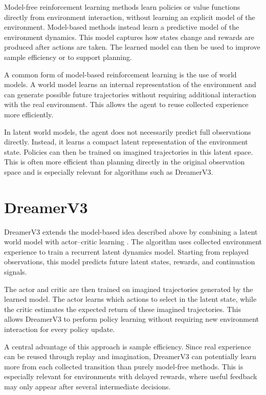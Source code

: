 \documentclass[english,bachelor]{hsluthesis}
\begin{document}
Model-free reinforcement learning methods learn policies or value functions directly from environment interaction, without learning an explicit model of the environment. Model-based methods instead learn a predictive model of the environment dynamics. This model captures how states change and rewards are produced after actions are taken. The learned model can then be used to improve sample efficiency or to support planning.

A common form of model-based reinforcement learning is the use of world models. A world model learns an internal representation of the environment and can generate possible future trajectories without requiring additional interaction with the real environment. This allows the agent to reuse collected experience more efficiently.

In latent world models, the agent does not necessarily predict full observations directly. Instead, it learns a compact latent representation of the environment state. Policies can then be trained on imagined trajectories in this latent space. This is often more efficient than planning directly in the original observation space and is especially relevant for algorithms such as DreamerV3.

\section{DreamerV3}

DreamerV3 extends the model-based idea described above by combining a latent world model with actor--critic learning \cite{hafner2024masteringdiversedomainsworld}. The algorithm uses collected environment experience to train a recurrent latent dynamics model. Starting from replayed observations, this model predicts future latent states, rewards, and continuation signals.

The actor and critic are then trained on imagined trajectories generated by the learned model. The actor learns which actions to select in the latent state, while the critic estimates the expected return of these imagined trajectories. This allows DreamerV3 to perform policy learning without requiring new environment interaction for every policy update.

A central advantage of this approach is sample efficiency. Since real experience can be reused through replay and imagination, DreamerV3 can potentially learn more from each collected transition than purely model-free methods. This is especially relevant for environments with delayed rewards, where useful feedback may only appear after several intermediate decisions.
\end{document}
